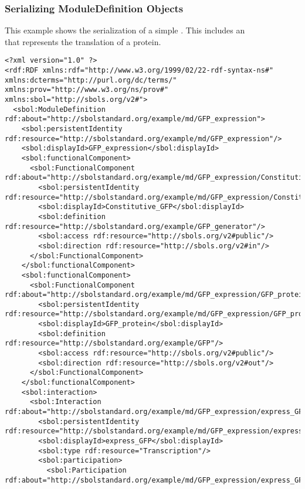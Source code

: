 \subsubsection{Serializing ModuleDefinition Objects}
This example shows the serialization of a simple . This  includes an\\
 that represents the translation of a protein.
\begin{lstlisting}
<?xml version="1.0" ?>
<rdf:RDF xmlns:rdf="http://www.w3.org/1999/02/22-rdf-syntax-ns#" xmlns:dcterms="http://purl.org/dc/terms/" xmlns:prov="http://www.w3.org/ns/prov#" xmlns:sbol="http://sbols.org/v2#">
  <sbol:ModuleDefinition rdf:about="http://sbolstandard.org/example/md/GFP_expression">
    <sbol:persistentIdentity rdf:resource="http://sbolstandard.org/example/md/GFP_expression"/>
    <sbol:displayId>GFP_expression</sbol:displayId>
    <sbol:functionalComponent>
      <sbol:FunctionalComponent rdf:about="http://sbolstandard.org/example/md/GFP_expression/Constitutive_GFP">
        <sbol:persistentIdentity rdf:resource="http://sbolstandard.org/example/md/GFP_expression/Constitutive_GFP"/>
        <sbol:displayId>Constitutive_GFP</sbol:displayId>
        <sbol:definition rdf:resource="http://sbolstandard.org/example/GFP_generator"/>
        <sbol:access rdf:resource="http://sbols.org/v2#public"/>
        <sbol:direction rdf:resource="http://sbols.org/v2#in"/>
      </sbol:FunctionalComponent>
    </sbol:functionalComponent>
    <sbol:functionalComponent>
      <sbol:FunctionalComponent rdf:about="http://sbolstandard.org/example/md/GFP_expression/GFP_protein">
        <sbol:persistentIdentity rdf:resource="http://sbolstandard.org/example/md/GFP_expression/GFP_protein"/>
        <sbol:displayId>GFP_protein</sbol:displayId>
        <sbol:definition rdf:resource="http://sbolstandard.org/example/GFP"/>
        <sbol:access rdf:resource="http://sbols.org/v2#public"/>
        <sbol:direction rdf:resource="http://sbols.org/v2#out"/>
      </sbol:FunctionalComponent>
    </sbol:functionalComponent>
    <sbol:interaction>
      <sbol:Interaction rdf:about="http://sbolstandard.org/example/md/GFP_expression/express_GFP">
        <sbol:persistentIdentity rdf:resource="http://sbolstandard.org/example/md/GFP_expression/express_GFP"/>
        <sbol:displayId>express_GFP</sbol:displayId>
        <sbol:type rdf:resource="Transcription"/>
        <sbol:participation>
          <sbol:Participation rdf:about="http://sbolstandard.org/example/md/GFP_expression/express_GFP/Protein">

\end{lstlisting}

